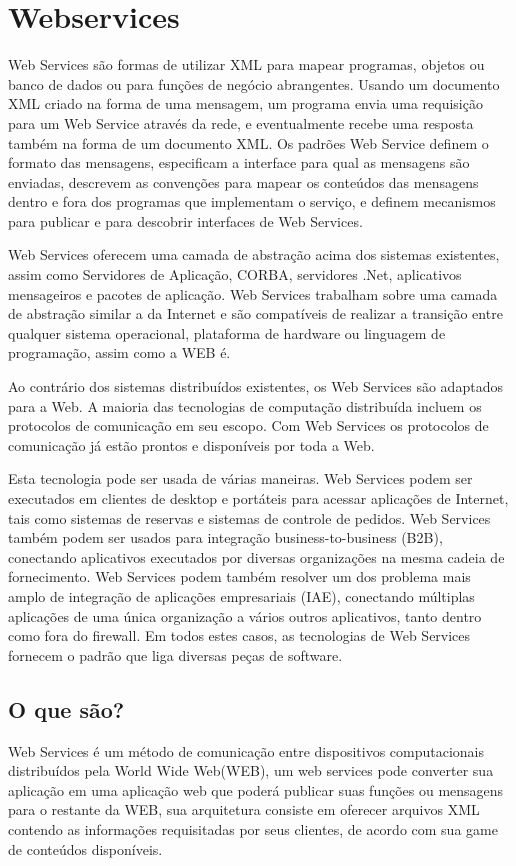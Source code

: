 \documentclass{acm_proc_article-sp}
\begin{document}
\section{Webservices}
		
		Web Services são formas de utilizar XML para mapear programas, objetos ou banco de dados ou para funções de negócio abrangentes. Usando um documento XML criado na forma de uma mensagem, um programa envia uma requisição para um Web Service através da rede, e eventualmente recebe uma resposta também na forma de um documento XML. Os padrões Web Service definem o formato das mensagens, especificam a interface para qual as mensagens são enviadas, descrevem as convenções para mapear os conteúdos das mensagens dentro e fora dos programas que implementam o serviço, e definem mecanismos para publicar e para descobrir interfaces de Web Services.
		
		Web Services oferecem uma camada de abstração acima dos sistemas existentes, assim como Servidores de Aplicação, CORBA, servidores .Net, aplicativos mensageiros e pacotes de aplicação. Web Services trabalham sobre 
		uma camada de abstração similar a da Internet e são compatíveis de realizar a transição entre qualquer sistema operacional, plataforma de hardware ou linguagem de programação, assim como a WEB é.
		
		Ao contrário dos sistemas distribuídos existentes, os Web Services são adaptados para a Web. A maioria das tecnologias de computação distribuída incluem os protocolos de comunicação em seu escopo. Com Web Services os protocolos de comunicação já estão prontos e disponíveis por toda a Web. 
		
		Esta tecnologia pode ser usada de várias maneiras. Web Services podem ser executados em clientes de desktop e portáteis para acessar aplicações de Internet, tais como sistemas de reservas e sistemas de controle de pedidos. Web Services também podem ser usados para integração business-to-business (B2B), conectando aplicativos executados por diversas organizações na mesma cadeia de fornecimento. Web Services podem também resolver um dos problema mais amplo de integração de aplicações empresariais (IAE), conectando múltiplas aplicações de uma única organização a vários outros aplicativos, tanto dentro como fora do firewall. Em todos estes casos, as tecnologias de Web Services fornecem o padrão que liga diversas peças de software.\cite{UNDERWEBSERVICES}

	\subsection{O que são?}
		Web Services é um método de comunicação entre dispositivos computacionais distribuídos pela World Wide Web(WEB), um web services pode converter sua aplicação em uma aplicação web que poderá publicar suas funções ou mensagens para o restante da WEB, sua arquitetura consiste em oferecer arquivos XML contendo as informações requisitadas por seus clientes, de acordo com sua game de conteúdos disponíveis.\cite{WEBS}
		
\end{document}
